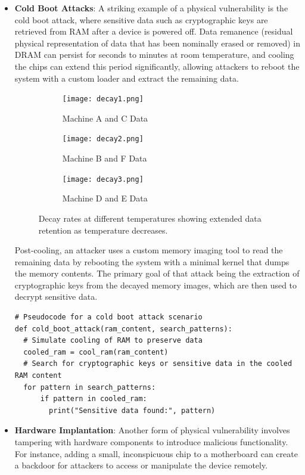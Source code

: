 \begin{itemize}
\item
  \textbf{Cold Boot Attacks}: A striking example of a physical
  vulnerability is the cold boot attack\cite{haldermanLestWeRemember2009}, 
  where sensitive data such as
  cryptographic keys are retrieved from RAM after a device is powered
  off. Data remanence (residual physical representation of data that has been nominally erased or removed) in DRAM can persist for seconds to minutes at room
  temperature, and cooling the chips can extend this period
  significantly, allowing attackers to reboot the system with a custom
  loader and extract the remaining data.

  \begin{figure}[h]
    \centering
    \begin{subfigure}{.33\textwidth}
      \centering
      \texttt{[image: decay1.png]}
      \caption{Machine A and C Data}
    \end{subfigure}%
    \begin{subfigure}{.33\textwidth}
      \centering
      \texttt{[image: decay2.png]}
      \caption{Machine B and F Data}
    \end{subfigure}
    \begin{subfigure}{.33\textwidth}
      \centering
      \texttt{[image: decay3.png]}
      \caption{Machine D and E Data}
    \end{subfigure}
    \caption{Decay rates at different temperatures showing extended data retention as temperature decreases.\cite{haldermanLestWeRemember2009}}
  \end{figure}

  Post-cooling, an attacker uses a custom memory imaging tool to read the remaining data by rebooting the system with a minimal kernel that dumps the memory contents.
  The primary goal of that attack being the extraction of cryptographic keys from the decayed memory images, which are then used to decrypt sensitive data.

\begin{verbatim}
# Pseudocode for a cold boot attack scenario
def cold_boot_attack(ram_content, search_patterns):
  # Simulate cooling of RAM to preserve data
  cooled_ram = cool_ram(ram_content)
  # Search for cryptographic keys or sensitive data in the cooled RAM content
  for pattern in search_patterns:
      if pattern in cooled_ram:
        print("Sensitive data found:", pattern)
\end{verbatim}

\item
  \textbf{Hardware Implantation}: Another form of physical vulnerability
  involves tampering with hardware components to introduce malicious
  functionality. For instance, adding a small, inconspicuous chip to a
  motherboard can create a backdoor for attackers to access or
  manipulate the device remotely.
\end{itemize}

